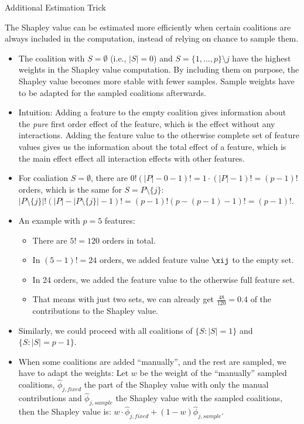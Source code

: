 \documentclass[11pt,compress,t,notes=noshow, xcolor=table]{beamer}
\begin{document}
\begin{vbframe}{Additional Estimation Trick}


  The Shapley value can be estimated more efficiently when certain coalitions are always included in the computation, instead of relying on chance to sample them.
  \begin{itemize}
    \item The coalition with $S = \emptyset$ (i.e., $|S| = 0$) and $S = \{1, \ldots, p\} \setminus j$ have the highest weights in the Shapley value computation. By including them on purpose, the Shapley value becomes more stable with fewer samples. Sample weights have to be adapted for the sampled coalitions afterwards.
    \item Intuition: Adding a feature to the empty coalition gives information about the \textit{pure} first order effect of the feature, which is the effect without any interactions. Adding the feature value to the otherwise complete set of feature values gives us the information about the total effect of a feature, which is the main effect effect all interaction effects with other features.
    \item For coaliation $S = \emptyset$, there are $0! (|P| - 0 - 1)! = 1 \cdot (|P| - 1)! = (p - 1)!$ orders, which is the same for $S = P \setminus \{j\}$: $|P \setminus \{j\}|! (|P| - |P \setminus \{j\}| - 1)! = (p - 1)! (p - (p-1) - 1)! = (p-1)!$.
    \item An example with $p = 5$ features:
      \begin{itemize}
        \item There are $5! = 120$ orders in total.
        \item In $(5 - 1)! = 24$ orders, we added feature value $\xij$ to the empty set.
        \item In 24 orders, we added the feature value to the otherwise full feature set.
        \item That means with just two sets, we can already get $\frac{48}{120} = 0.4$ of the contributions to the Shapley value.
      \end{itemize}
    \item Similarly, we could proceed with all coalitions of $\{S: |S| = 1\}$ and $\{S: |S| = p - 1\}$.
    \item When some coalitions are added \enquote{manually}, and the rest are sampled, we have to adapt the weights: Let $w$ be the weight of the \enquote{manually} sampled coalitions, $\hat{\phi}_{j,fixed}$ the part of the Shapley value with only the manual contributions and $\hat{\phi}_{j,sample}$ the Shapley value with the sampled coalitions, then the Shapley value is: $w \cdot \hat{\phi}_{j,fixed} + (1 - w) \hat{\phi}_{j,sample}$.
  \end{itemize}


\end{vbframe}
\end{document}

